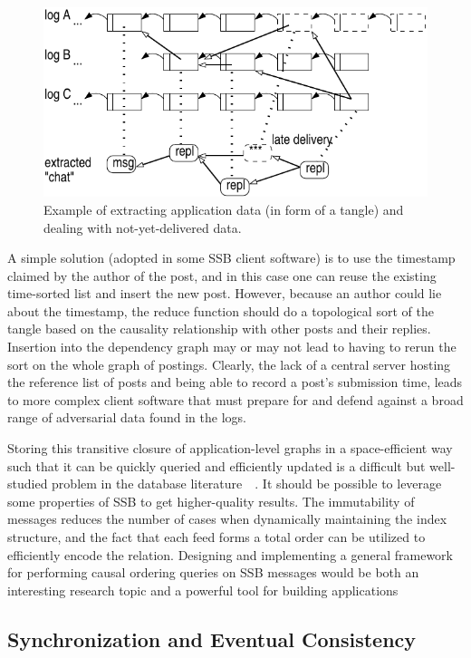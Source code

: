 \documentclass[10pt,sigconf]{acmart}
\begin{document}
\begin{figure}[htb]
  \includegraphics[width=0.9\columnwidth]{figs/tangle.pdf}
  \caption{Example of extracting application data (in form of
    a tangle) and dealing
    with not-yet-delivered data.\label{fig:tangle}}
\end{figure}

A simple solution (adopted in some SSB client software) is to use the
timestamp claimed by the author of the post, and in this case one can
reuse the existing time-sorted list and insert the new post. However,
because an author could lie about the timestamp, the reduce function
should do a topological sort of the tangle based on the causality relationship with
other posts and their replies. Insertion into the dependency graph may
or may not lead to having to rerun the sort on the whole graph of
postings. Clearly, the lack of a central server hosting the reference
list of posts and being able to record a post's submission time, leads
to more complex client software that must prepare for and defend
against a broad range of adversarial data found in the logs.

Storing this transitive closure of application-level graphs in a space-efficient way such that it can be quickly queried and efficiently updated is a difficult but well-studied problem in the database literature~\cite{jin2012scarab}~\cite{yildirim2013dagger}. It should be possible to leverage some properties of SSB to get higher-quality results. The immutability of messages reduces the number of cases when dynamically maintaining the index structure, and the fact that each feed forms a total order can be utilized to efficiently encode the relation. Designing and implementing a general framework for performing causal ordering queries on SSB messages would be both an interesting research topic and a powerful tool for building applications

\subsection{Synchronization and Eventual Consistency}
\label{Section:Tangle}
\end{document}
